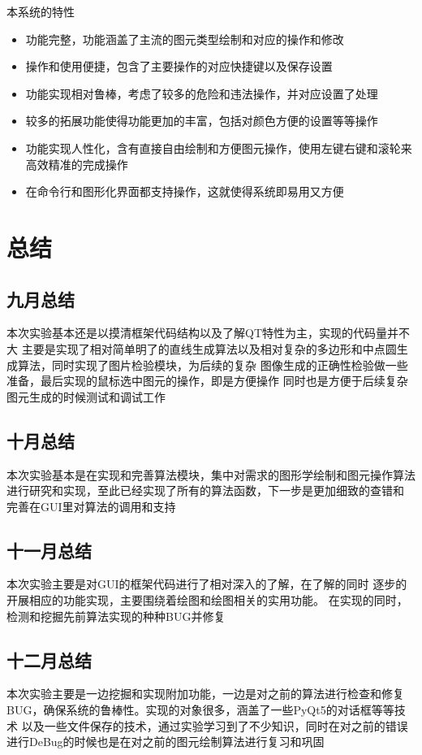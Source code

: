 \documentclass[a4paper,UTF8]{article}
\theoremstyle{definition}
\begin{document}
本系统的特性
\begin{itemize}
    \item 功能完整，功能涵盖了主流的图元类型绘制和对应的操作和修改
    \item 操作和使用便捷，包含了主要操作的对应快捷键以及保存设置
    \item 功能实现相对鲁棒，考虑了较多的危险和违法操作，并对应设置了处理
    \item 较多的拓展功能使得功能更加的丰富，包括对颜色方便的设置等等操作
    \item 功能实现人性化，含有直接自由绘制和方便图元操作，使用左键右键和滚轮来
    高效精准的完成操作
    \item 在命令行和图形化界面都支持操作，这就使得系统即易用又方便
\end{itemize}

\section{总结}
\subsection{九月总结}
本次实验基本还是以摸清框架代码结构以及了解QT特性为主，实现的代码量并不大
主要是实现了相对简单明了的直线生成算法以及相对复杂的多边形和中点圆生成算法，同时实现了图片检验模块，为后续的复杂
图像生成的正确性检验做一些准备，最后实现的鼠标选中图元的操作，即是方便操作
同时也是方便于后续复杂图元生成的时候测试和调试工作

\subsection{十月总结}
本次实验基本是在实现和完善算法模块，集中对需求的图形学绘制和图元操作算法
进行研究和实现，至此已经实现了所有的算法函数，下一步是更加细致的查错和
完善在GUI里对算法的调用和支持

\subsection{十一月总结}
本次实验主要是对GUI的框架代码进行了相对深入的了解，在了解的同时
逐步的开展相应的功能实现，主要围绕着绘图和绘图相关的实用功能。
在实现的同时，检测和挖掘先前算法实现的种种BUG并修复

\subsection{十二月总结}
本次实验主要是一边挖掘和实现附加功能，一边是对之前的算法进行检查和修复
BUG，确保系统的鲁棒性。实现的对象很多，涵盖了一些PyQt5的对话框等等技术
以及一些文件保存的技术，通过实验学习到了不少知识，同时在对之前的错误
进行DeBug的时候也是在对之前的图元绘制算法进行复习和巩固
\end{document}
